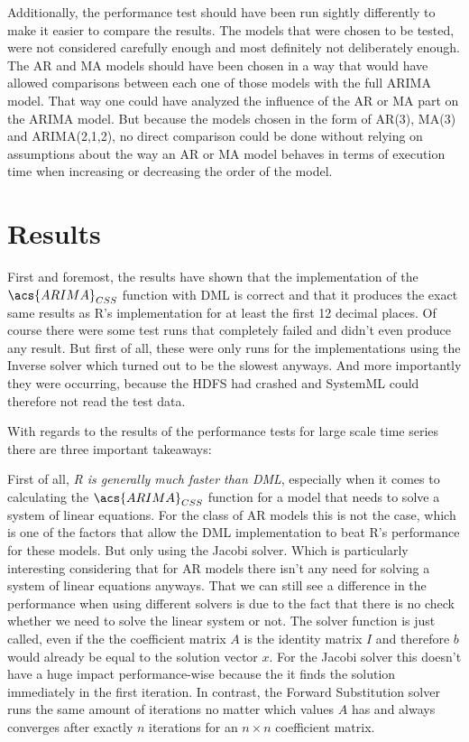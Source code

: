 Additionally, the performance test should have been run sightly differently to make it easier to compare the results. The models that were chosen to be tested, were not considered carefully enough and most definitely not deliberately enough. The \acs{AR} and \acs{MA} models should have been chosen in a way that would have allowed comparisons between each one of those models with the full \acs{ARIMA} model. That way one could have analyzed the influence of the \acs{AR} or \acs{MA} part on the \acs{ARIMA} model. But because the models chosen in the form of \acs{AR}(3), \acs{MA}(3) and \acs{ARIMA}(2,1,2), no direct comparison could be done without relying on assumptions about the way an \acs{AR} or \acs{MA} model behaves in terms of execution time when increasing or decreasing the order of the model.



\section{Results}\label{conclude_results}

First and foremost, the results have shown that the implementation of the $\acs{ARIMA}_{CSS}$ function with \acs{DML} is correct and that it produces the exact same results as R's implementation for at least the first 12 decimal places. Of course there were some test runs that completely failed and didn't even produce any result. But first of all, these were only runs for the implementations using the Inverse solver which turned out to be the slowest anyways. And more importantly they were occurring, because the \acl{HDFS} had crashed and SystemML could therefore not read the test data.

With regards to the results of the performance tests for large scale time series there are three important takeaways: 

First of all, \textit{R is generally much faster than DML}, especially when it comes to calculating the $\acs{ARIMA}_{CSS}$ function for a model that needs to solve a system of linear equations. For the class of \acs{AR} models this is not the case, which is one of the factors that allow the \acs{DML} implementation to beat R's performance for these models. But only using the Jacobi solver. Which is particularly interesting considering that for \acs{AR} models there isn't any need for solving a system of linear equations anyways. That we can still see a difference in the performance when using different solvers is due to the fact that there is no check whether we need to solve the linear system or not. The solver function is just called, even if the the coefficient matrix $A$ is the identity matrix $I$ and therefore $b$ would already be equal to the solution vector $x$. For the Jacobi solver this doesn't have a huge impact performance-wise because the it finds the solution immediately in the first iteration. In contrast, the Forward Substitution solver runs the same amount of iterations no matter which values $A$ has and always converges after exactly $n$ iterations for an $n \times n$ coefficient matrix.

